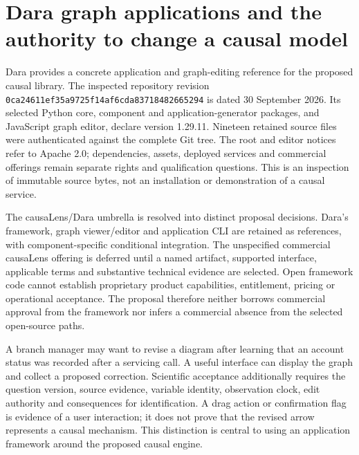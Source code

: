 \section{Dara graph applications and the authority to change a causal model}
\label{sec:exec25-dara-reuse}
Dara provides a concrete application and graph-editing reference for the
proposed causal library. The inspected repository revision
\texttt{0ca24611ef35a9725f14a}\allowbreak\texttt{f6cda83718482665294}
is dated 30 September 2026. Its selected Python core, component and
application-generator packages, and JavaScript graph editor, declare version
1.29.11. Nineteen retained source files were authenticated against the complete
Git tree. The root and editor notices refer to Apache 2.0; dependencies,
assets, deployed services and commercial offerings remain separate rights and
qualification questions. This is an inspection of immutable source bytes,
not an installation or demonstration of a causal service.
\citep{exec25_dara_source}

The causaLens/Dara umbrella is resolved into distinct proposal decisions.
Dara's framework, graph viewer/editor and application CLI are retained as
references, with component-specific conditional integration. The unspecified
commercial causaLens offering is deferred until a named artifact, supported
interface, applicable terms and substantive technical evidence are selected.
Open framework code cannot establish proprietary product capabilities,
entitlement, pricing or operational acceptance. The proposal therefore neither
borrows commercial approval from the framework nor infers a commercial
absence from the selected open-source paths.~\citep{exec25_dara_choice}

A branch manager may want to revise a diagram after learning that an account
status was recorded after a servicing call. A useful interface can display the
graph and collect a proposed correction. Scientific acceptance additionally
requires the question version, source evidence, variable identity, observation
clock, edit authority and consequences for identification. A drag action or
confirmation flag is evidence of a user interaction; it does not prove that
the revised arrow represents a causal mechanism. This distinction is central
to using an application framework around the proposed causal engine.
\citep{exec25_dara_choice}

